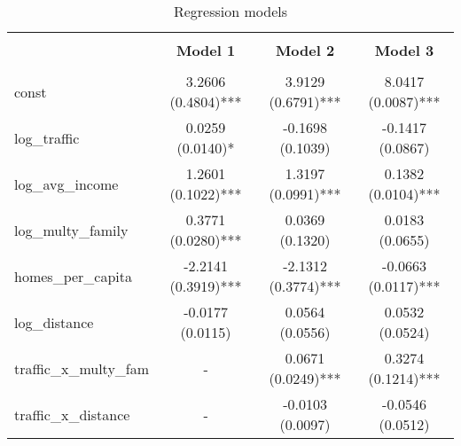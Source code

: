 
    \begin{table}
        \centering
        \caption{Regression models}
        \vspace{10pt}
        \label{tab:regression_models}
        \begin{tabular}{lccc}
        \hline
        \hline \\[-1.8ex]
     & \textbf{Model 1} & \textbf{Model 2} & \textbf{Model 3} \\
\hline \\[-1.8ex] 
const & 3.2606 (0.4804)*** & 3.9129 (0.6791)*** & 8.0417 (0.0087)*** \\
log\_traffic & 0.0259 (0.0140)* & -0.1698 (0.1039) & -0.1417 (0.0867) \\
log\_avg\_income & 1.2601 (0.1022)*** & 1.3197 (0.0991)*** & 0.1382 (0.0104)*** \\
log\_multy\_family & 0.3771 (0.0280)*** & 0.0369 (0.1320) & 0.0183 (0.0655) \\
homes\_per\_capita & -2.2141 (0.3919)*** & -2.1312 (0.3774)*** & -0.0663 (0.0117)*** \\
log\_distance & -0.0177 (0.0115) & 0.0564 (0.0556) & 0.0532 (0.0524) \\
traffic\_x\_multy\_fam & - & 0.0671 (0.0249)*** & 0.3274 (0.1214)*** \\
traffic\_x\_distance & - & -0.0103 (0.0097) & -0.0546 (0.0512) \\

        \hline
        \hline
        \end{tabular}
    \end{table}
    